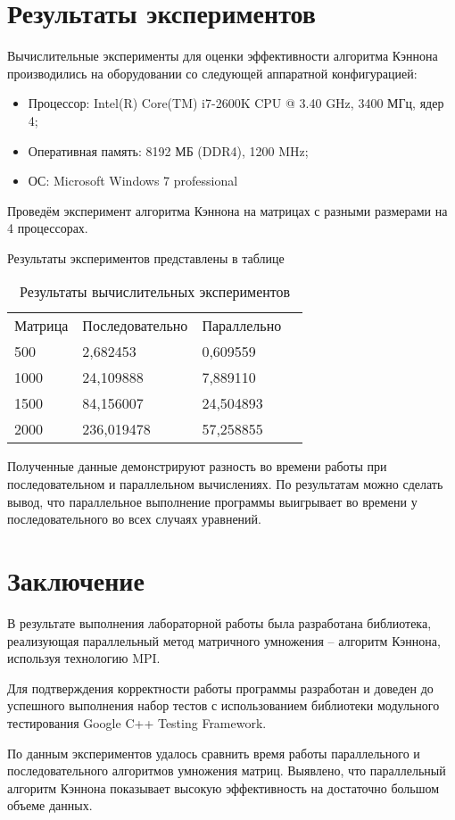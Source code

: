 \documentclass{report}
\begin{document}
\section*{Результаты экспериментов}
Вычислительные эксперименты для оценки эффективности алгоритма Кэннона производились на оборудовании со следующей аппаратной конфигурацией:

\begin{itemize}
\item Процессор: Intel(R) Core(TM) i7-2600K CPU @ 3.40 GHz, 3400 МГц, ядер 4;
\item Оперативная память: 8192 МБ (DDR4), 1200 MHz;
\item ОС: Microsoft Windows 7 professional 
\end{itemize}

\par Проведём эксперимент алгоритма Кэннона на матрицах с разными размерами на 4 процессорах. 
\par Результаты экспериментов представлены в таблице

\begin{table}[!h]
\caption{Результаты вычислительных экспериментов}
\centering
\begin{tabular}{p{3cm} p{4cm} p{4cm} p{4cm}}
Матрица  & Последовательно & Параллельно \\
500      & 2,682453          & 0,609559  \\
1000     & 24,109888         & 7,889110  \\
1500     & 84,156007         & 24,504893 \\
2000     & 236,019478        & 57,258855   

\end{tabular}
\end{table}

\par Полученные данные демонстрируют разность во времени работы при последовательном и параллельном вычислениях. По результатам можно сделать вывод, что параллельное выполнение программы выигрывает во времени у последовательного во всех случаях уравнений.
\newpage

\section*{Заключение}
В результате выполнения лабораторной работы была разработана библиотека, реализующая
параллельный метод матричного умножения – алгоритм Кэннона, используя технологию MPI.
\par Для подтверждения корректности работы программы разработан и доведен до успешного
выполнения набор тестов с использованием библиотеки модульного тестирования Google C++
Testing Framework.
\par По данным экспериментов удалось сравнить время работы параллельного и последовательного
алгоритмов умножения матриц. Выявлено, что параллельный алгоритм Кэннона показывает высокую
эффективность на достаточно большом объеме данных.
\newpage
\end{document}
